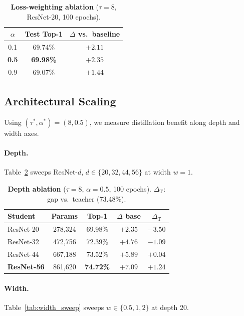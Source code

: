 \documentclass{article}
\theoremstyle{plain}
\theoremstyle{definition}
\theoremstyle{remark}
\begin{document}
\begin{table}[ht]
  \centering
  \caption{\textbf{Loss-weighting ablation} ($\tau = 8$, ResNet-20, 100 epochs).}
  \label{tab:alpha_sweep}
  \begin{tabular}{ccc}
    \toprule
    $\alpha$ & Test Top-1 & $\Delta$ vs.\ baseline \\
    \midrule
    0.1 & 69.74\% & $+2.11$ \\
    \textbf{0.5} & \textbf{69.98\%} & $\mathbf{+2.35}$ \\
    0.9 & 69.07\% & $+1.44$ \\
    \bottomrule
  \end{tabular}
\end{table}

\subsection{Architectural Scaling}
\label{sec:results_arch}

Using $(\tau^*, \alpha^*) = (8, 0.5)$, we measure distillation benefit along depth and width axes.

\paragraph{Depth.} Table~\ref{tab:depth_sweep} sweeps ResNet-$d$, $d \in \{20, 32, 44, 56\}$ at width $w=1$.

\begin{table}[ht]
  \centering
  \caption{\textbf{Depth ablation} ($\tau=8$, $\alpha=0.5$, 100 epochs). $\Delta_{\text{T}}$: gap vs.\ teacher (73.48\%).}
  \label{tab:depth_sweep}
  \begin{tabular}{lcccc}
    \toprule
    Student & Params & Top-1 & $\Delta$ base & $\Delta_{\text{T}}$ \\
    \midrule
    ResNet-20 & 278{,}324 & 69.98\% & $+2.35$ & $-3.50$ \\
    ResNet-32 & 472{,}756 & 72.39\% & $+4.76$ & $-1.09$ \\
    ResNet-44 & 667{,}188 & 73.52\% & $+5.89$ & $+0.04$ \\
    \textbf{ResNet-56} & 861{,}620 & \textbf{74.72\%} & $\mathbf{+7.09}$ & $\mathbf{+1.24}$ \\
    \bottomrule
  \end{tabular}
\end{table}

\paragraph{Width.} Table~\ref{tab:width_sweep} sweeps $w \in \{0.5, 1, 2\}$ at depth 20.
\end{document}
